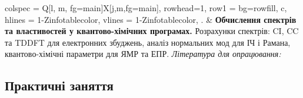 \documentclass{Syllabus}
\def\lit{\textit{Література для опрацювання:\ }}
\begin{document}
\begin{longtblr}[]{
	colspec = {Q[l, m, fg=main]X[j,m,fg=main]},
    rowhead=1,
	row{1} = {bg=rowfill, c},
	hlines = {1-Z}{infotablecolor},
	vlines = {1-Z}{infotablecolor},
	}
\rownumber.
& \textbf{Обчислення спектрів та властивостей у квантово-хімічних програмах.} Розрахунки спектрів: CI, CC та TDDFT для електронних збуджень, аналіз нормальних мод для ІЧ і Рамана, квантово-хімічні параметри для ЯМР та ЕПР.
\newline
\lit{}\cite[11]{Sauer}
\\
\end{longtblr}

\subsection*{Практичні заняття}
\end{document}
